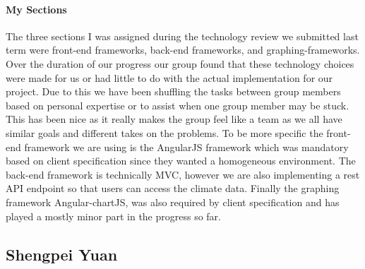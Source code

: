 \documentclass[onecolumn, draftclsnofoot,10pt, compsoc]{article}
\begin{document}
        \paragraph{My Sections} 
        The three sections I was assigned during the technology review we submitted last term were front-end frameworks, back-end frameworks, and graphing-frameworks. Over the duration of our progress our group found that these technology choices were made for us or had little to do with the actual implementation for our project. Due to this we have been shuffling the tasks between group members based on personal expertise or to assist when one group member may be stuck. This has been nice as it really makes the group feel like a team as we all have similar goals and different takes on the problems. To be more specific the front-end framework we are using is the AngularJS framework which was mandatory based on client specification since they wanted a homogeneous environment. The back-end framework is technically MVC, however we are also implementing a rest API endpoint so that users can access the climate data. Finally the graphing framework Angular-chartJS, was also required by client specification and has played a mostly minor part in the progress so far.


\subsection{Shengpei Yuan}
\end{document}

